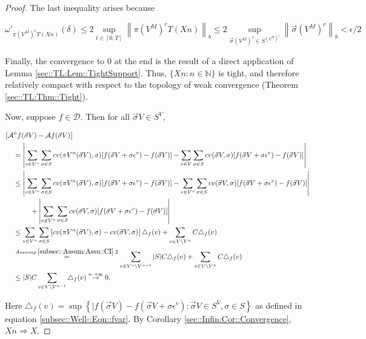 \documentclass[12pt]{article}
\newcommand{\mb}{\mathbb}
\newcommand{\mc}{\mathcal}
\newcommand{\ra}{\rightarrow}
\newcommand{\os}{\overset}
\newcommand{\ep}{\epsilon}
\newcommand{\ind}{\hspace{24pt}}
\renewcommand{\v}{v}							%
\renewcommand{\S}{S}							%
\newcommand{\s}{\sigma}							%
\newcommand{\sv}{\vec{\s}}						%
\renewcommand{\b}{b}							%
\newcommand{\ev}[1]{\ep^{#1}}					%
\newcommand{\T}{T}								%
\renewcommand{\t}{t}							%
\newcommand{\proj}{\pi}							%
\newcommand{\X}{X}								%
\newcommand{\IG}{\mc{A}}						%
\newcommand{\IGr}{c}							%
\newcommand{\const}{C}							%
\newcommand{\sln}[1]{^{#1}}						%
\newcommand{\core}{\mc{D}}							%
\newcommand{\XState}[1]{\S^{#1}}				%
\begin{document}
\begin{proof}
The last inequality arises because

\[\omega'_{\proj{\left( V\sln{M}\right)^c}{\T}(\X{}{}{n})}(\delta) \leq 2 \sup_{\t\in [0,\T]} \left\|\proj{\left( V\sln{M}\right)^c}{\T}(\X{}{}{n})\right\|_{\b{}} \leq 2 \sup_{\sv{}{\left( V\sln{M}\right)^c} \in \S^{\left( V\sln{M}\right)^c}} \left\|\sv{}{\left( V\sln{M}\right)^c}\right\|_{\b{}} < \ep/2\]

Finally, the convergence to 0 at the end is the result of a direct application of Lemma \ref{sec::TL:Lem::TightSupport}. Thus, \(\{\X{}{}{n}:n\in \mb{N}\}\) is tight, and therefore relatively compact with respect to the topology of weak convergence (Theorem \ref{sec::TL:Thm::Tight}).

Now, suppose \(f\in \core\). Then for all \(\sv{}{ V} \in \S^ V\),

\begin{align*}
\big|\IG&\sln{n}f(\sv{}{ V}) - \IG f(\sv{}{ V})\big|\\
&= \left|\sum_{\v \in  V\sln{n}} \sum_{\s \in \S} \IGr{\v}(\proj{ V\sln{n}}{}(\sv{}{ V}),\s)[f(\sv{}{ V}+\s\ev{\v}) - f(\sv{}{ V})] - \sum_{\v \in  V}\sum_{\s \in \S} \IGr{\v}(\sv{}{ V},\s)[f(\sv{}{ V}+\s\ev{\v}) - f(\sv{}{ V})]\right|\\
&\leq  \left|\sum_{\v \in  V\sln{n}} \sum_{\s \in \S} \IGr{\v}(\proj{ V\sln{n}}{}(\sv{}{ V}),\s)[f(\sv{}{ V}+\s\ev{\v}) - f(\sv{}{ V})] - \sum_{\v \in  V\sln{n}}\sum_{\s \in \S} \IGr{\v}(\sv{}{ V},\s)[f(\sv{}{ V}+\s\ev{\v}) - f(\sv{}{ V})]\right|\\
&\ind  +\left|\sum_{\v \notin  V\sln{n}} \sum_{\s\in \S} \IGr{\v}(\sv{}{ V},\s)[f(\sv{}{ V}+\s\ev{\v}) - f(\sv{}{ V})]\right|\\
&\leq \sum_{\v \in  V\sln{n}}\sum_{\s \in \S} \left|\IGr{\v}(\proj{ V\sln{n}}{}(\sv{}{ V}),\s) - \IGr{\v}(\sv{}{ V},\s)\right|\triangle_f(\v) + \sum_{\v \in  V\setminus  V\sln{n}} \const{}\triangle_f(\v)\\
&\os{Assump. \ref{subsec::Assum:Assu::CI}.2}{=} \sum_{\v \in  V\sln{n}\setminus V\sln{n-1}} |\S|\const{} \triangle_f(\v) + \sum_{\v \in  V\setminus  V\sln{n}} \const{}\triangle_f(\v)\\
&\leq |\S|C\sum_{\v \in  V\setminus  V\sln{n-1}} \triangle_f(\v) \os{n\ra\infty}{\ra} 0.
\end{align*}

Here \(\triangle_f(\v) = \sup\left\{|f(\sv{}{ V}) - f(\sv{}{ V} + \s\ev{\v}): \sv{}{ V}\in \S^ V,\s \in \S\right\}\) as defined in equation \eqref{subsec::Well-:Eqn::fvar}. By Corollary \ref{sec::Infin:Cor::Convergence}, \(\X{}{}{n}\Rightarrow \X{}{}\).
\end{proof}
\end{document}
